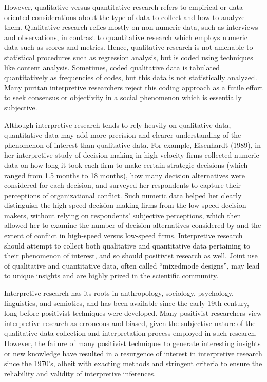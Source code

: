However, qualitative versus quantitative research refers to empirical or data-oriented considerations about the type of data to collect and how to analyze them. Qualitative research relies mostly on non-numeric data, such as interviews and observations, in contrast to quantitative research which employs numeric data such as scores and metrics. Hence, qualitative research is not amenable to statistical procedures such as regression analysis, but is coded using techniques like content analysis. Sometimes, coded qualitative data is tabulated quantitatively as frequencies of codes, but this data is not statistically analyzed. Many puritan interpretive researchers reject this coding approach as a futile effort to seek consensus or objectivity in a social phenomenon which is essentially subjective.

Although interpretive research tends to rely heavily on qualitative data, quantitative data may add more precision and clearer understanding of the phenomenon of interest than qualitative data. For example, Eisenhardt (1989), in her interpretive study of decision making in high-velocity firms collected numeric data on how long it took each firm to make certain strategic decisions (which ranged from 1.5 months to 18 months), how many decision alternatives were considered for each decision, and surveyed her respondents to capture their perceptions of organizational conflict. Such numeric data helped her clearly distinguish the high-speed decision making firms from the low-speed decision makers, without relying on respondents' subjective perceptions, which then allowed her to examine the number of decision alternatives considered by and the extent of conflict in high-speed versus low-speed firms. Interpretive research should attempt to collect both qualitative and quantitative data pertaining to their phenomenon of interest, and so should positivist research as well. Joint use of qualitative and quantitative data, often called ``mixedmode designs'', may lead to unique insights and are highly prized in the scientific community.

Interpretive research has its roots in anthropology, sociology, psychology, linguistics, and semiotics, and has been available since the early 19th century, long before positivist techniques were developed. Many positivist researchers view interpretive research as erroneous and biased, given the subjective nature of the qualitative data collection and interpretation process employed in such research. However, the failure of many positivist techniques to generate interesting insights or new knowledge have resulted in a resurgence of interest in interpretive research since the 1970's, albeit with exacting methods and stringent criteria to ensure the reliability and validity of interpretive inferences.

